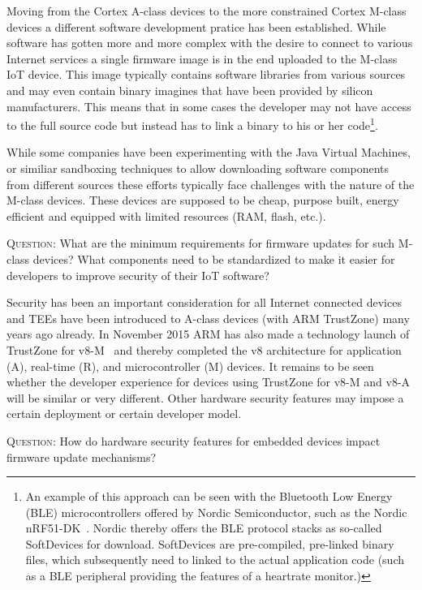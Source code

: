 \documentclass[peerreview, a4paper, 7pt]{IEEEtran}
\begin{document}
Moving from the Cortex A-class devices to the more constrained Cortex M-class devices a different software development pratice has been established. While software has gotten more and more complex with the desire to connect to various Internet services a single firmware image is in the end uploaded to the M-class IoT device. This image typically contains software libraries from various sources and may even contain binary imagines that have been provided by silicon manufacturers. This means that in some cases the developer may not have access to the full source code but instead has to link a binary to his or her code\footnote{An example of this approach can be seen with the Bluetooth Low Energy (BLE) microcontrollers offered by Nordic Semiconductor, such as the Nordic nRF51-DK~\cite{nRF51-DK}. Nordic thereby offers the BLE protocol stacks as so-called SoftDevices for download. SoftDevices are pre-compiled, pre-linked binary files, which subsequently need to linked to the actual application code (such as a BLE peripheral providing the features of a heartrate monitor.)}.

While some companies have been experimenting with the Java Virtual Machines, or similiar sandboxing techniques to allow downloading software components from different sources these efforts typically face challenges with the nature of the M-class devices. These devices are supposed to be cheap, purpose built, energy efficient and equipped with limited resources (RAM, flash, etc.).  

\textsc{Question}: What are the minimum requirements for firmware updates for such M-class devices? What components need to be standardized to make it easier for developers to improve security of their IoT software?

Security has been an important consideration for all Internet connected devices and TEEs have been introduced to A-class devices (with ARM TrustZone) many years ago already. In November 2015 ARM has also made a technology launch of TrustZone for v8-M~\cite{Trustzone} and thereby completed the v8 architecture for application (A), real-time (R), and microcontroller (M) devices. It remains to be seen whether the developer experience for devices using TrustZone for v8-M and v8-A will be similar or very different. Other hardware security features may impose a certain deployment or certain developer model.

\textsc{Question}: How do hardware security features for embedded devices impact firmware update mechanisms?
\end{document}
